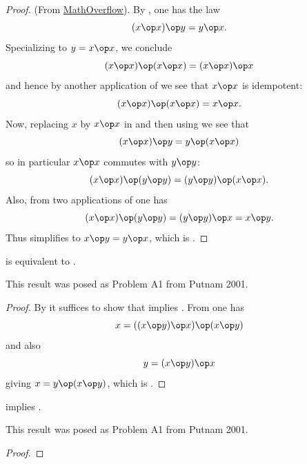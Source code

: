 \begin{proof}\leanok (From \href{https://mathoverflow.net/a/450905/766}{MathOverflow}).
  By , one has the law
\begin{equation}\label{387-again}
  (x \op x) \op y = y \op x.
\end{equation}
Specializing to $y=x \op x$, we conclude
$$(x \op x) \op (x \op x) = (x \op x) \op x$$
and hence by another application of  we see that $x \op x$ is idempotent:
\begin{equation}\label{idem}
  (x \op x) \op (x \op x) = x \op x.
\end{equation}
Now, replacing $x$ by $x \op x$ in  and then using  we see that
$$ (x \op x) \op y = y \op (x \op x)$$
so in particular $x \op x$ commutes with $y \op y$:
\begin{equation}\label{op-idem} (x \op x) \op (y \op y) = (y \op y) \op (x \op x).
\end{equation}
Also, from two applications of  one has
$$(x \op x) \op (y \op y) = (y \op y) \op x = x \op y.$$
Thus  simplifies to $x \op y = y \op x$, which is .
\end{proof}

\begin{theorem}[29 equivalent to 14]\label{29_equiv_14} \leanok  {} is equivalent to .
\end{theorem}

This result was posed as Problem A1 from Putnam 2001.

\begin{proof}\leanok{} By  it suffices to show that  implies .  From  one has
  $$ x = ((x \op y) \op x) \op (x \op y)$$
  and also
  $$ y = (x \op y) \op x$$
  giving $x = y \op (x \op y)$, which is .
\end{proof}

\begin{theorem}[14 implies 29]\label{14_implies_29} \leanok  {} implies .
\end{theorem}

This result was posed as Problem A1 from Putnam 2001.

\begin{proof}\leanok
\end{proof}

